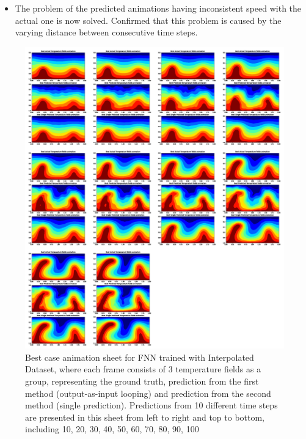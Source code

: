 {\begin{itemize}
\begin{itemize}
            \item The problem of the predicted animations having inconsistent speed with the actual one is now solved. Confirmed that this problem is caused by the varying distance between consecutive time steps.
            
    \end{itemize} 
       
\end{itemize}

\begin{figure}[H]
    \includegraphics[width=\linewidth]{figures/FNN_animation_sheet.png}
    \caption{Best case animation sheet for FNN trained with Interpolated Dataset, where each frame consists of 3 temperature fields as a group, representing the ground truth, prediction from the first method (output-as-input looping) and prediction from the second method (single prediction). Predictions from 10 different time steps are presented in this sheet from left to right and top to bottom, including 10, 20, 30, 40, 50, 60, 70, 80, 90, 100}
\end{figure}

}

